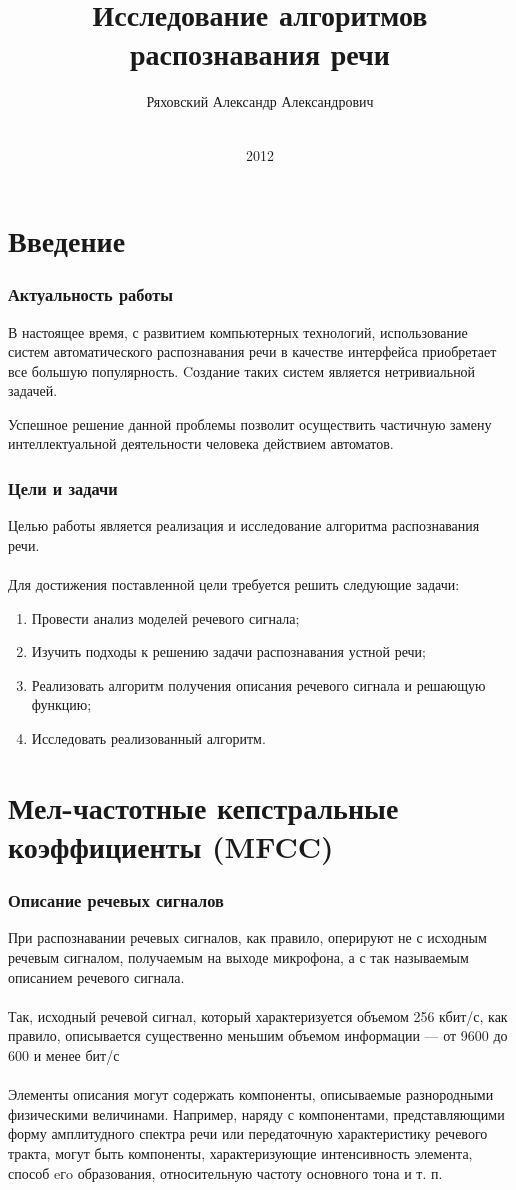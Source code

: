 \documentclass[slidestop, compress, mathserif, blackandwhite, utf8, serif, slidescentered]{beamer}
\title{Исследование алгоритмов\\ распознавания речи}
\author{Ряховский Александр Александрович}
\institute{Национальный Исследовательский Университет\\ <<Белгородский Государственный Университет>>}
\date{\\ 2012}
\begin{document}
\section{Введение}
\begin{frame}[plain]
	\frametitle{Актуальность работы}
	В настоящее время, с развитием компьютерных технологий, использование систем автоматического распознавания речи в качестве интерфейса приобретает все большую популярность. Cоздание таких систем является нетривиальной задачей.

	Успешное решение данной проблемы позволит осуществить частичную замену интеллектуальной деятельности человека действием автоматов.
\end{frame}
\begin{frame}[plain]
	\frametitle{Цели и задачи}
	Целью работы является реализация и исследование алгоритма распознавания речи.\\~\\

	Для достижения поставленной цели требуется решить следующие задачи:
	\begin{enumerate}[1)]
		\item Провести анализ моделей речевого сигнала;
		\item Изучить подходы к решению задачи распознавания устной речи;
		\item Реализовать алгоритм получения описания речевого сигнала и решающую функцию;
		\item Исследовать реализованный алгоритм.
	\end{enumerate}
\end{frame}

\section{Мел-частотные кепстральные коэффициенты (MFCC)}
\begin{frame}
	\frametitle{Описание речевых сигналов}
	При распознавании речевых сигналов, как правило, оперируют не с исходным речевым сигналом, получаемым на выходе микрофона, а с так называемым описанием речевого сигнала.\\~\\

	Так, исходный речевой сигнал, который характеризуется объемом 256 кбит/с, как правило, описывается существенно меньшим объемом информации --- от 9600 до 600 и менее бит/с\\~\\

	Элементы описания могут содержать компоненты, описываемые разнородными физическими величинами. Например, наряду с компонентами, представляющими форму амплитудного спектра речи или передаточную характеристику речевого тракта, могут быть компоненты, характеризующие интенсивность элемента, способ eгo образования, относительную частоту основного тона и т. п.

\end{frame}
\end{document}
